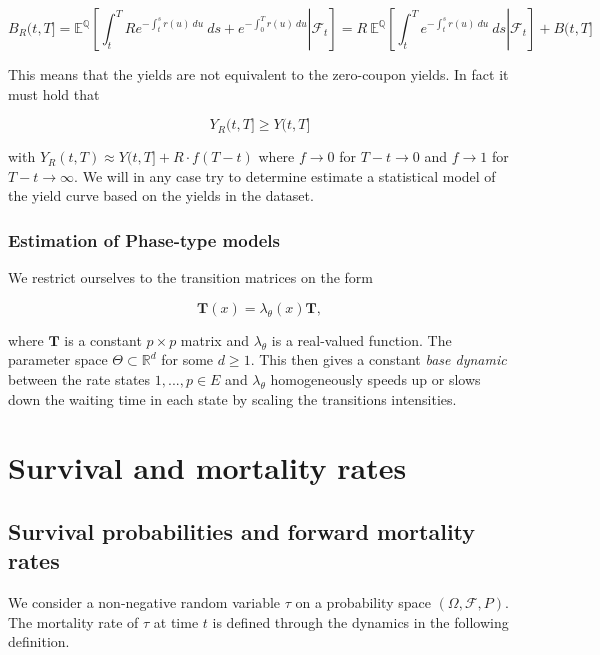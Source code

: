 \documentclass[a4paper,10pt,openany]{book}
\begin{document}
\[
B_R(t,T]=\mathbb E^{\mathbb Q}\left[\left.\int_t^T Re^{-\int_t^s r(u)\ du}\ ds+e^{-\int_0^T r(u)\ du} \right\vert\mathcal F_t\right]=R\ \mathbb  E^{\mathbb Q}\left[\left.\int_t^T e^{-\int_t^s r(u)\ du}\ ds \right\vert\mathcal F_t\right]+ B(t,T]
\]

This means that the yields are not equivalent to the zero-coupon yields. In fact it must hold that

\[
Y_R(t,T]\ge Y(t,T]
\]

with \(Y_R(t,T)\approx Y(t,T]+R\cdot f(T-t)\) where \(f\to 0\) for \(T-t\to 0\) and \(f\to 1\) for \(T-t\to \infty\). We will in any case try to determine estimate a statistical model of the yield curve based on the yields in the dataset.

\hypertarget{estimation-of-phase-type-models}{%
\subsubsection{Estimation of Phase-type models}\label{estimation-of-phase-type-models}}

We restrict ourselves to the transition matrices on the form

\[
\mathbf T(x)=\lambda_\theta(x)\mathbf T,
\]

where \(\mathbf T\) is a constant \(p\times p\) matrix and \(\lambda_\theta\) is a real-valued function. The parameter space \(\Theta\subset \mathbb R^d\) for some \(d\ge 1\). This then gives a constant \emph{base dynamic} between the rate states \(1,...,p\in E\) and \(\lambda_\theta\) homogeneously speeds up or slows down the waiting time in each state by scaling the transitions intensities.

\hypertarget{survival-and-mortality-rates}{%
\section{Survival and mortality rates}\label{survival-and-mortality-rates}}

\hypertarget{survival-probabilities-and-forward-mortality-rates}{%
\subsection{Survival probabilities and forward mortality rates}\label{survival-probabilities-and-forward-mortality-rates}}

We consider a non-negative random variable \(\tau\) on a probability space \((\Omega,\mathcal F, P)\). The mortality rate of \(\tau\) at time \(t\) is defined through the dynamics in the following definition.
\end{document}
